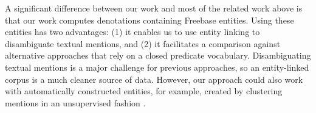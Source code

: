 \documentclass[11pt]{article}
\begin{document}


A significant difference between our work and most of the related work
above is that our work computes denotations containing Freebase
entities. Using these entities has two advantages: (1) it enables us
to use entity linking to disambiguate textual mentions, and (2) it
facilitates a comparison against alternative approaches that rely on a
closed predicate vocabulary. Disambiguating textual mentions is a
major challenge for previous approaches, so an entity-linked corpus is
a much cleaner source of data. However, our approach could also work
with automatically constructed entities, for example, created by
clustering mentions in an unsupervised fashion \cite{singh11}.

\end{document}
